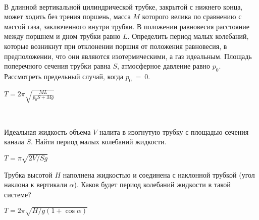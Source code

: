 \begin{ex}
\hspace{0pt} \\
\begin{minipage}{.65\textwidth} 
В длинной вертикальной цилиндрической трубке, закрытой с нижнего конца, может ходить без трения поршень, 
масса $M$ которого велика по сравнению с массой газа, заключенного внутри трубки. В положении равновесия расстояние между поршнем и дном трубки равно $L$. 
Определить период малых колебаний, которые возникнут при отклонении поршня от положения равновесия, в предположении, что они являются изотермическими, 
а газ идеальным. Площадь поперечного сечения трубки равна $S$, атмосферное давление равно $p_0$. Рассмотреть предельный случай, когда $p_0$~=~0.
\end{minipage}
\begin{minipage}{.35\textwidth}
\centering

\end{minipage}
\begin{ans}
$T=2\pi\sqrt{\frac{ML}{p_0S + Mg}}$
\end{ans}
\end{ex}

\begin{ex}
\hspace{0pt} \\
\begin{minipage}{.65\textwidth} 
Идеальная жидкость объема $V$ налита в изогнутую трубку с площадью сечения канала $S$. Найти период малых колебаний жидкости.
\end{minipage}
\begin{minipage}{.35\textwidth}
\centering

\end{minipage}
\begin{ans}
$T=\pi \sqrt{2V/Sg}$
\end{ans}
\end{ex}

\begin{ex}
Трубка высотой $H$ наполнена жидкостью и соединена с наклонной трубкой (угол наклона к вертикали $\alpha$). Каков будет период колебаний жидкости в такой системе?
\begin{ans}
$T=2\pi \sqrt{H/g(1+\cos \alpha)}$
\end{ans}
\end{ex}

